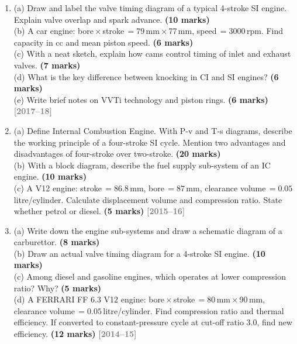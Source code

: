 \documentclass[12pt,a3paper]{article}
\newcommand{\yr}[1]{\hfill\textcolor{gray}{\small\textbf{[#1]}}}
\newcommand{\mk}[1]{\textcolor{orange!70!black}{\small\textbf{(#1 marks)}}}
\begin{document}
\begin{enumerate}
\item \label{qlabel:A2-Q13}
(a) Draw and label the valve timing diagram of a typical 4-stroke SI engine. Explain valve overlap and spark advance. \mk{10}\\
(b) A car engine: bore\,$\times$\,stroke\,$= 79$\,mm\,$\times$\,77\,mm, speed\,$= 3000$\,rpm. Find capacity in cc and mean piston speed. \mk{6}\\
(c) With a neat sketch, explain how cams control timing of inlet and exhaust valves. \mk{7}\\
(d) What is the key difference between knocking in CI and SI engines? \mk{6}\\
(e) Write brief notes on VVTi technology and piston rings. \mk{6}
\yr{2017--18}




\item \label{qlabel:A2-Q22}
(a) Define Internal Combustion Engine. With P-v and T-s diagrams, describe the working principle of a four-stroke SI cycle. Mention two advantages and disadvantages of four-stroke over two-stroke. \mk{20}\\
(b) With a block diagram, describe the fuel supply sub-system of an IC engine. \mk{10}\\
(c) A V12 engine: stroke\,$= 86.8$\,mm, bore\,$= 87$\,mm, clearance volume\,$= 0.05$\,litre/cylinder. Calculate displacement volume and compression ratio. State whether petrol or diesel. \mk{5}
\yr{2015--16}




\item \label{qlabel:A2-Q21}
(a) Write down the engine sub-systems and draw a schematic diagram of a carburettor. \mk{8}\\
(b) Draw an actual valve timing diagram for a 4-stroke SI engine. \mk{10}\\
(c) Among diesel and gasoline engines, which operates at lower compression ratio? Why? \mk{5}\\
(d) A FERRARI FF 6.3 V12 engine: bore\,$\times$\,stroke\,$= 80$\,mm\,$\times$\,90\,mm, clearance volume\,$= 0.05$\,litre/cylinder. Find compression ratio and thermal efficiency. If converted to constant-pressure cycle at cut-off ratio 3.0, find new efficiency. \mk{12}
\yr{2014--15}





\end{enumerate}
\end{document}
